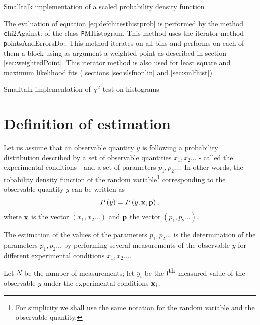 \begin{listing} Smalltalk implementation of a scaled
probability density function \label{ls:scaleddist}

\end{listing}

The evaluation of equation \ref{eq:defchitesthistprob} is
performed by the method {\texttt chi2Against:} of the class {\texttt
PMHistogram}. This method uses the iterator method {\texttt
pointsAndErrorsDo:}. This method iterates on all bins and performs
on each of them a block using as argument a weighted point as
described in section \ref{sec:weightedPoint}. This iterator method
is also used for least square and maximum likelihood fits (\cf
sections \ref{sec:slsfnonlin} and \ref{sec:smlfhist}).

\begin{listing} Smalltalk implementation of $\chi^2$-test on histograms \label{ls:chitesthist}

\end{listing}

\section{Definition of estimation}
Let us assume that an observable quantity $y$ is following a
probability distribution described by a set of observable
quantities $x_1,x_2\ldots$ - called the experimental conditions -
and a set of parameters $p_1,p_2\ldots$.
In other words, the robability density function of the random variable\footnote{For
simplicity we shall use the same notation for the random variable
and the observable quantity.} corresponding to the observable
quantity $y$ can be written as
\begin{equation}
\label{eq:estimprob}
  P\left(y\right)=P\left(y;{\textbf x},{\textbf p}\right),
\end{equation}
where ${\textbf x}$ is the vector $\left(x_1,x_2\ldots\right)$ and
${\textbf p}$ the vector $\left(p_1,p_2\ldots\right)$.

The estimation of the values of the parameters $p_1,p_2\ldots$ is
the determination of the parameters $p_1,p_2\ldots$ by performing
several measurements of the observable $y$ for different
experimental conditions $x_1,x_2\ldots$.

Let $N$ be the number of measurements; let $y_i$ be the $\mbox{\textrm
i}^{\mbox{\textrm th}}$ measured value of the observable $y$ under the
experimental conditions ${\textbf x}_i$.

